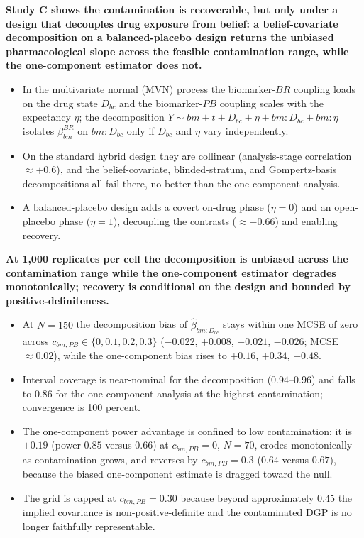 \documentclass[
  11pt,
]{article}
\begin{document}
\textbf{Study C shows the contamination is recoverable, but only under a design that decouples drug exposure from belief: a belief-covariate decomposition on a balanced-placebo design returns the unbiased pharmacological slope across the feasible contamination range, while the one-component estimator does not.}

\begin{itemize}\setlength{\itemsep}{2pt}\setlength{\parskip}{0pt}
\item In the multivariate normal (MVN) process the biomarker-$BR$ coupling loads on the drug state $D_{bc}$ and the biomarker-$PB$ coupling scales with the expectancy $\eta$; the decomposition $Y \sim bm + t + D_{bc} + \eta + bm{:}D_{bc} + bm{:}\eta$ isolates $\beta_{bm}^{BR}$ on $bm{:}D_{bc}$ only if $D_{bc}$ and $\eta$ vary independently.
\item On the standard hybrid design they are collinear (analysis-stage correlation $\approx +0.6$), and the belief-covariate, blinded-stratum, and Gompertz-basis decompositions all fail there, no better than the one-component analysis.
\item A balanced-placebo design adds a covert on-drug phase ($\eta=0$) and an open-placebo phase ($\eta=1$), decoupling the contrasts ($\approx -0.66$) and enabling recovery.
\end{itemize}

\textbf{At 1{,}000 replicates per cell the decomposition is unbiased across the contamination range while the one-component estimator degrades monotonically; recovery is conditional on the design and bounded by positive-definiteness.}

\begin{itemize}\setlength{\itemsep}{2pt}\setlength{\parskip}{0pt}
\item At $N=150$ the decomposition bias of $\hat\beta_{bm:D_{bc}}$ stays within one MCSE of zero across $c_{bm,PB} \in \{0, 0.1, 0.2, 0.3\}$ ($-0.022$, $+0.008$, $+0.021$, $-0.026$; MCSE $\approx 0.02$), while the one-component bias rises to $+0.16$, $+0.34$, $+0.48$.
\item Interval coverage is near-nominal for the decomposition ($0.94$--$0.96$) and falls to $0.86$ for the one-component analysis at the highest contamination; convergence is 100 percent.
\item The one-component power advantage is confined to low contamination: it is $+0.19$ (power $0.85$ versus $0.66$) at $c_{bm,PB}=0$, $N=70$, erodes monotonically as contamination grows, and reverses by $c_{bm,PB}=0.3$ ($0.64$ versus $0.67$), because the biased one-component estimate is dragged toward the null.
\item The grid is capped at $c_{bm,PB}=0.30$ because beyond approximately $0.45$ the implied covariance is non-positive-definite and the contaminated DGP is no longer faithfully representable.
\end{itemize}
\end{document}
